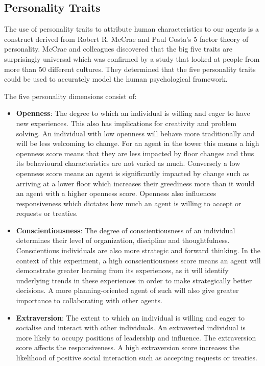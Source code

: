 \subsection{Personality Traits}
\label{subsec: Agent Design}
The use of personality traits to attribute human characteristics to our agents is a construct derived from Robert R. McCrae and Paul Costa's 5 factor theory of personality. McCrae and colleagues discovered that the big five traits are surprisingly universal which was confirmed by a study that looked at people from more than 50 different cultures. They determined that the five personality traits could be used to accurately model the human psychological framework.

The five personality dimensions consist of: 
\begin{itemize}
    \item  \textbf{Openness}: The degree to which an individual is willing and eager to have new experiences. This also has implications for creativity and problem solving. An individual with low openness will behave more traditionally and will be less welcoming to change. For an agent in the tower this means a high openness score means that they are less impacted by floor changes and thus its behavioural characteristics are not varied as much. Conversely a low openness score means an agent is significantly impacted by change such as arriving at a lower floor which increases their greediness more than it would an agent with a higher openness score. Openness also influences responsiveness which dictates how much an agent is willing to accept or requests or treaties.
    \item  \textbf{Conscientiousness}: The degree of conscientiousness of an individual determines their level of organization, discipline and thoughtfulness. Conscientious individuals are also more strategic and forward thinking. In the context of this experiment, a high conscientiousness score means an agent will demonstrate greater learning from its experiences, as it will identify underlying trends in these experiences in order to make strategically better decisions. A more planning-oriented agent of such will also give greater importance to collaborating with other agents.
    \item  \textbf{Extraversion}: The extent to which an individual is willing and eager to socialise and interact with other individuals. An extroverted individual is more likely to occupy positions of leadership and influence. The extraversion score affects the responsiveness. A high extraversion score increases the likelihood of positive social interaction such as accepting requests or treaties. 

\end{itemize}
